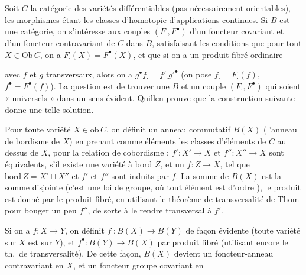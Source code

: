 \documentclass[11pt,a4paper]{article}
\begin{document}
Soit $C$ la catégorie des variétés différentiables (pas nécessairement
orientables), les morphismes étant les classes d'homotopie d'applications
continues. Si $B$ est une catégorie, on s'intéresse aux couples $(F_{\cdot},
F^{\bullet})$ d'un foncteur covariant et d'un foncteur contravariant de $C$ dans
$B$, satisfaisant les conditions que pour tout $X \in \mathrm{Ob}\, C$, on a
$F_{\cdot}(X) = F^{\bullet}(X)$, et que si on a un produit fibré ordinaire


avec $f$ et $g$ transversaux, alors on a $g^{\bullet} f_{\cdot} = f'_{\cdot}
g'^{\bullet}$ (on pose $f_{\cdot} = F_{\cdot}(f)$, $f^{\bullet} =
F^{\bullet}(f)$). La question est de trouver une $B$ et un couple $(F_{\cdot},
F^{\bullet})$ qui soient « universels » dans un sens évident. Quillen prouve que
la construction suivante donne une telle solution.

Pour toute variété $X \in \mathrm{ob}\, C$, on définit un anneau commutatif
$B(X)$ (l'anneau de bordisme de $X$) en prenant comme éléments les classes
d'éléments de $C$ au dessus de $X$, pour la relation de cobordisme : $f' : X'
\to X$ et $f'' : X'' \to X$ sont équivalents, s'il existe une variété à bord
$Z$, et un $f : Z \to X$, tel que $\mathrm{bord}\, Z = X' \sqcup X''$ et $f'$
et $f''$ sont induits par $f$. La somme de $B(X)$ est la somme disjointe (c'est
une loi de groupe,  où tout élément est d'ordre ), le produit est donné
par le produit fibré, en utilisant le théorème de transversalité de Thom pour
bouger un peu $f''$, de sorte à le rendre transversal à $f'$.


Si on a $f : X \to Y$, on définit $f_{\cdot} : B(X) \to B(Y)$ de façon
évidente (toute variété sur $X$ est sur $Y$), et $f^{\bullet} : B(Y) \to B(X)$
par produit fibré (utilisant encore le th.\ de transversalité). De cette façon,
$B(X)$ devient un foncteur-anneau  contravariant en $X$, et un
foncteur groupe covariant en
\end{document}
